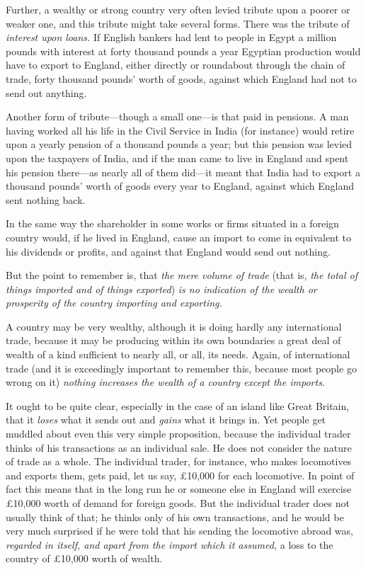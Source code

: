 \documentclass{book}
\begin{document}
Further, a wealthy or strong country very often levied tribute upon a poorer or weaker one, and this tribute might take several forms. There was the tribute of \emph{interest upon loans.} If English bankers had lent to people in Egypt a million pounds with interest at forty thousand pounds a year Egyptian production would have to export to England, either directly or roundabout through the chain of trade, forty thousand pounds’ worth of goods, against which England had not to send out anything.

Another form of tribute—though a small one—is that paid in pensions. A man having worked all his life in the Civil Service in India (for instance) would retire upon a yearly pension of a thousand pounds a year; but this pension was levied upon the taxpayers of India, and if the man came to live in England and spent his pension there—as nearly all of them did—it meant that India had to export a thousand pounds’ worth of goods every year to England, against which England sent nothing back.

In the same way the shareholder in some works or firms situated in a foreign country would, if he lived in England, cause an import to come in equivalent to his dividends or profits, and against that England would send out nothing.

But the point to remember is, that \emph{the mere volume of trade} (that is, \emph{the total of things imported and of things exported}) \emph{is no indication of the wealth or prosperity of the country importing and exporting.}

A country may be very wealthy, although it is doing hardly any international trade, because it may be producing within its own boundaries a great deal of wealth of a kind sufficient to nearly all, or all, its needs. Again, of international trade (and it is exceedingly important to remember this, because most people go wrong on it) \emph{nothing increases the wealth of a country except the imports.}

It ought to be quite clear, especially in the case of an island like Great Britain, that it \emph{loses} what it sends out and \emph{gains} what it brings in. Yet people get muddled about even this very simple proposition, because the individual trader thinks of his transactions as an individual sale. He does not consider the nature of trade as a whole. The individual trader, for instance, who makes locomotives and exports them, gets paid, let us say, £10,000 for each locomotive. In point of fact this means that in the long run he or someone else in England will exercise £10,000 worth of demand for foreign goods. But the individual trader does not usually think of that; he thinks only of his own transactions, and he would be very much surprised if he were told that his sending the locomotive abroad was, \emph{regarded in itself, and apart from the import which it assumed,} a loss to the country of £10,000 worth of wealth.
\end{document}
